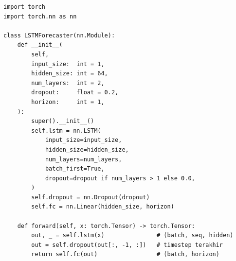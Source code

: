 \begin{lstlisting}[caption={Implementasi Arsitektur Model LSTM}, label={lst:lstm-model}, style=pythonstyle]
import torch
import torch.nn as nn

class LSTMForecaster(nn.Module):
    def __init__(
        self,
        input_size:  int = 1,
        hidden_size: int = 64,
        num_layers:  int = 2,
        dropout:     float = 0.2,
        horizon:     int = 1,
    ):
        super().__init__()
        self.lstm = nn.LSTM(
            input_size=input_size,
            hidden_size=hidden_size,
            num_layers=num_layers,
            batch_first=True,
            dropout=dropout if num_layers > 1 else 0.0,
        )
        self.dropout = nn.Dropout(dropout)
        self.fc = nn.Linear(hidden_size, horizon)

    def forward(self, x: torch.Tensor) -> torch.Tensor:
        out, _ = self.lstm(x)               # (batch, seq, hidden)
        out = self.dropout(out[:, -1, :])   # timestep terakhir
        return self.fc(out)                 # (batch, horizon)
\end{lstlisting}
